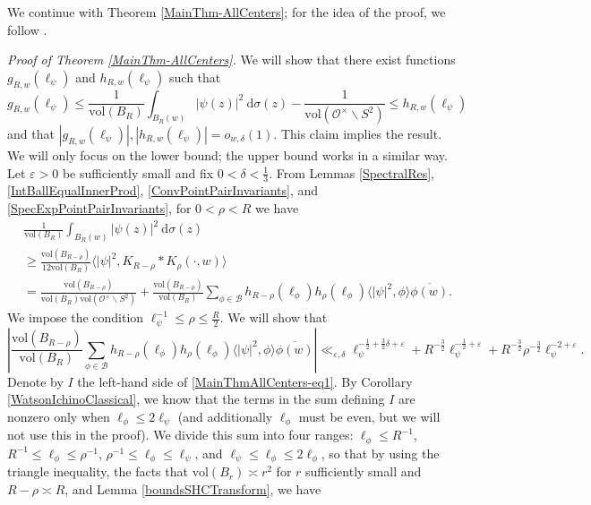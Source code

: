 \documentclass[11pt]{amsart}
\theoremstyle{definition}
\begin{document}
We continue with Theorem \ref{MainThm-AllCenters}; for the idea of the proof, we follow \cite[Thm.~1.5]{HumphriesRadziwill}.

\vspace{0.3cm}

\noindent \textit{Proof of Theorem \ref{MainThm-AllCenters}.} We will show that there exist functions $g_{R,w}(\ell_{\psi})$ and $h_{R,w}(\ell_{\psi})$ such that $$ g_{R,w}(\ell_{\psi}) \leq \frac{1}{\mathrm{vol}(B_R)} \int_{B_R (w)} |\psi(z)|^2 \: \mathrm{d}\sigma(z) - \frac{1}{\mathrm{vol}(\mathcal{O}^{\times} \backslash S^2)} \leq h_{R,w}(\ell_{\psi})$$ and that $|g_{R,w}(\ell_{\psi})|, |h_{R,w}(\ell_{\psi})| = o_{w,\delta}(1)$. This claim implies the result. We will only focus on the lower bound; the upper bound works in a similar way. Let $\varepsilon>0$ be sufficiently small and fix $0<\delta < \frac{1}{3}$. From Lemmas \ref{SpectralRes}, \ref{IntBallEqualInnerProd}, \ref{ConvPointPairInvariants}, and \ref{SpecExpPointPairInvariants}, for $0<\rho < R$ we have 
\begin{align}
    &\frac{1}{\mathrm{vol}(B_R)} \int_{B_R (w)} |\psi(z)|^2 \: \mathrm{d}\sigma(z) \label{MainThmAllCenters-eq0} \\
    &\geq \frac{\mathrm{vol}(B_{R-\rho})}{12\mathrm{vol}(B_R)} \langle |\psi|^2, K_{R-\rho} * K_{\rho} (\cdot, w) \rangle \nonumber \\
    &= \frac{\mathrm{vol}(B_{R-\rho})}{\mathrm{vol}(B_{R})\mathrm{vol}(\mathcal{O}^{\times} \backslash S^2)} + \frac{\mathrm{vol}(B_{R-\rho})}{\mathrm{vol}(B_R)} \sum_{\phi \in \mathcal{B}} h_{R-\rho}(\ell_{\phi}) h_{\rho}(\ell_{\phi}) \langle |\psi|^2, \phi\rangle \overline{\phi(w)}. \nonumber
\end{align}
We impose the condition $\ell_{\psi}^{-1} \leq \rho \leq \frac{R}{2}$. We will show that 
\begin{equation}
    \left|\frac{\mathrm{vol}(B_{R-\rho})}{\mathrm{vol}(B_R)} \sum_{\phi \in \mathcal{B}} h_{R-\rho}(\ell_{\phi}) h_{\rho}(\ell_{\phi}) \langle |\psi|^2, \phi\rangle \overline{\phi(w)} \right| \ll_{\varepsilon, \delta} \ell_{\psi}^{-\frac{1}{2} + \frac{3}{2}\delta + \varepsilon} + R^{-\frac{3}{2}} \ell_{\psi}^{- \frac{1}{2} + \varepsilon} + R^{-\frac{3}{2}} \rho^{-\frac{3}{2}} \ell_{\psi}^{-2+\varepsilon}. \label{MainThmAllCenters-eq1}
\end{equation}
Denote by $I$ the left-hand side of \eqref{MainThmAllCenters-eq1}. By Corollary \ref{WatsonIchinoClassical}, we know that the terms in the sum defining $I$ are nonzero only when $\ell_{\phi} \leq 2\ell_{\psi}$ (and additionally $\ell_{\phi}$ must be even, but we will not use this in the proof). We divide this sum into four ranges: $\ell_{\phi} \leq R^{-1}$, $R^{-1} \leq \ell_{\phi} \leq \rho^{-1}$, $\rho^{-1} \leq \ell_{\phi} \leq \ell_{\psi}$, and $\ell_{\psi} \leq \ell_{\phi} \leq 2\ell_{\phi}$, so that by using the triangle inequality, the facts that $\mathrm{vol}(B_{r}) \asymp r^2$ for $r$ sufficiently small and $R-\rho \asymp R$, and Lemma \ref{boundsSHCTransform}, we have
\end{document}
